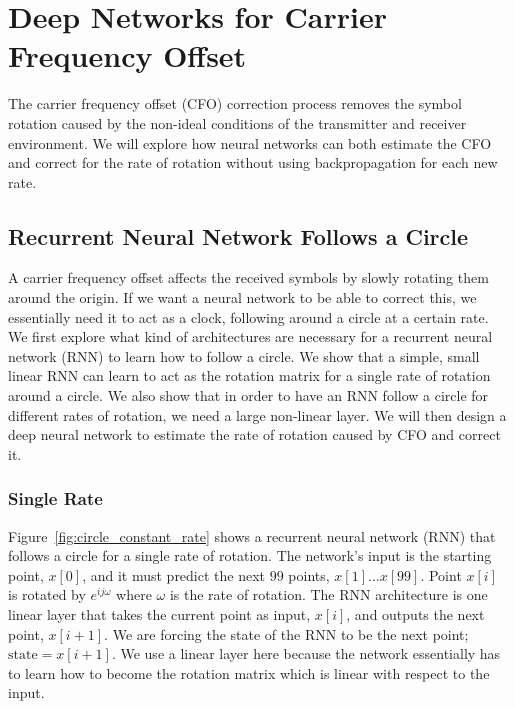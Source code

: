 \chapter[Deep Networks for Carrier Frequency Offset]{Deep Networks for Carrier Frequency Offset\raisebox{.3\baselineskip}{\normalsize\footnotemark}}

The carrier frequency offset (CFO) correction process removes the symbol rotation caused by the non-ideal conditions of the transmitter and receiver environment.  We will explore how neural networks can both estimate the CFO and correct for the rate of rotation without using backpropagation for each new rate.

\section{Recurrent Neural Network Follows a Circle}

A carrier frequency offset affects the received symbols by slowly rotating them around the origin.  If we want a neural network to be able to correct this, we essentially need it to act as a clock, following around a circle at a certain rate.
We first explore what kind of architectures are necessary for a recurrent neural network (RNN) to learn how to follow a circle.
We show that a simple, small linear RNN can learn to act as the rotation matrix for a single rate of rotation around a circle.
We also show that in order to have an RNN follow a circle for different rates of rotation, we need a large non-linear layer.
We will then design a deep neural network to estimate the rate of rotation caused by CFO and correct it.

\subsection{Single Rate}

Figure~\ref{fig:circle_constant_rate} shows a recurrent neural network (RNN) that follows a circle for a single rate of rotation.  The network's input is the starting point, $x[0]$, and it must predict the next $99$ points, $x[1] \ldots x[99]$.  Point $x[i]$ is rotated by $e^{ij\omega}$ where $\omega$ is the rate of rotation.  The RNN architecture is one linear layer that takes the current point as input, $x[i]$, and outputs the next point, $x[i+1]$.  We are forcing the state of the RNN to be the next point; $\text{state} = x[i+1]$.  We use a linear layer here because the network essentially has to learn how to become the rotation matrix which is linear with respect to the input. 

